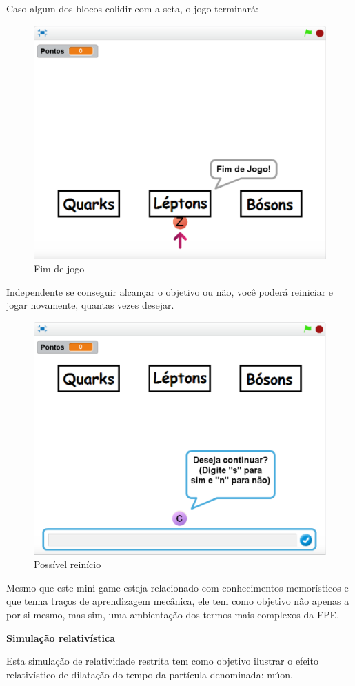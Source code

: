 \documentclass[12pt,fleqn]{book} %
\begin{document}
Caso algum dos blocos colidir com a seta, o jogo terminará:

\begin{figure}[h]
	\centering
	\includegraphics[width=0.63 \textwidth]{Produto/class7}
	\caption{Fim de jogo}
	\label{fig:app_a:class7}
\end{figure}

\newpage

Independente se conseguir alcançar o objetivo ou não, você poderá reiniciar e jogar novamente, quantas vezes desejar.

\begin{figure}[h]
	\centering
	\includegraphics[width=0.65 \textwidth]{Produto/class9}
	\caption{Possível reinício}
	\label{fig:app_a:class9}
\end{figure}

Mesmo que este mini game esteja relacionado com conhecimentos memorísticos e que tenha traços de aprendizagem mecânica, ele tem como objetivo não apenas a  por si mesmo, mas sim, uma ambientação dos termos mais complexos da FPE.

\textbf{Simulação relativística}

Esta simulação de relatividade restrita tem como objetivo ilustrar o efeito relativístico de dilatação do tempo da partícula denominada: múon.
\end{document}
